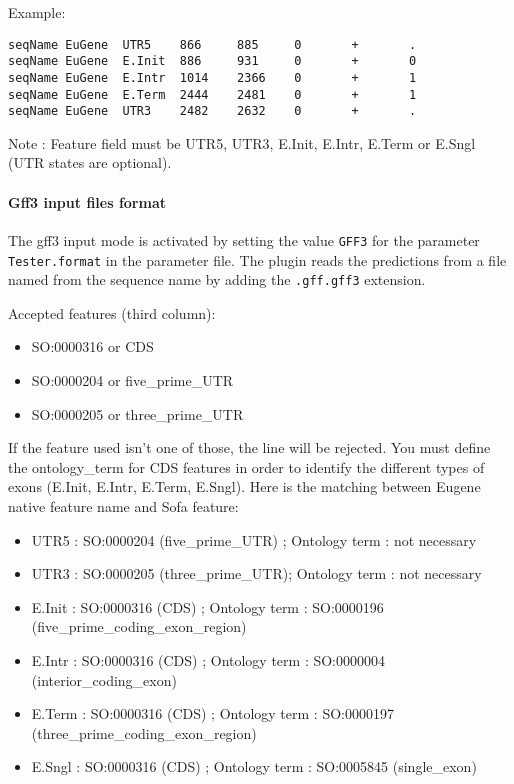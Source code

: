 Example:
\begin{Verbatim}[fontsize=\small]
seqName EuGene  UTR5    866     885     0       +       .
seqName EuGene  E.Init  886     931     0       +       0
seqName EuGene  E.Intr  1014    2366    0       +       1
seqName EuGene  E.Term  2444    2481    0       +       1
seqName EuGene  UTR3    2482    2632    0       +       .
\end{Verbatim}
Note : Feature field must be UTR5, UTR3, E.Init, E.Intr, E.Term or E.Sngl (UTR states are optional).

\paragraph{Gff3 input files format}

The gff3 input mode is activated by setting the value \texttt{GFF3}
for the parameter \texttt{Tester.format} in the parameter file.  The
plugin reads the predictions from a file named from the sequence name
by adding the \texttt{.gff.gff3} extension.

Accepted features (third column):\\
\begin{itemize}
\item  SO:0000316 or CDS
\item  SO:0000204 or five\_prime\_UTR
\item  SO:0000205 or three\_prime\_UTR
\end{itemize}
If the feature used isn't one of those, the line will be rejected.
You must define the ontology\_term for CDS features in order to
identify the different types of exons (E.Init, E.Intr, E.Term,
E.Sngl).  Here is the matching between Eugene native feature name and
Sofa feature:

\begin{itemize}
\item  UTR5 :  SO:0000204 (five\_prime\_UTR) ; Ontology term : not necessary
\item  UTR3 :  SO:0000205 (three\_prime\_UTR); Ontology term : not necessary
\item  E.Init : SO:0000316 (CDS)	     ; Ontology term : SO:0000196 	(five\_prime\_coding\_exon\_region)
\item  E.Intr : SO:0000316 (CDS)	     ; Ontology term : SO:0000004	(interior\_coding\_exon)
\item  E.Term : SO:0000316 (CDS)	     ; Ontology term : SO:0000197	(three\_prime\_coding\_exon\_region)
\item  E.Sngl : SO:0000316 (CDS)	     ; Ontology term : SO:0005845	(single\_exon)
\end{itemize}

